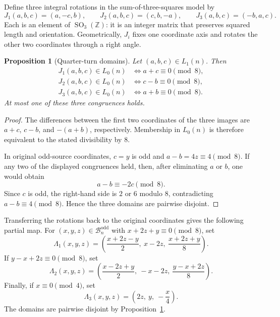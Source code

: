 \documentclass[11pt]{amsart}
\newtheorem{proposition}[theorem]{Proposition}
\theoremstyle{definition}
\theoremstyle{remark}
\newcommand{\Z}{\mathbb Z}
\newcommand{\Bodd}{\mathcal B_n^{\mathrm{odd}}}
\begin{document}
Define three integral rotations in the sum-of-three-squares model by
\[
 J_1(a,b,c)=(a,-c,b),
 \qquad
 J_2(a,b,c)=(c,b,-a),
 \qquad
 J_3(a,b,c)=(-b,a,c).
\]
Each is an element of $\operatorname{SO}_3(\Z)$: it is an integer matrix that
preserves squared length and orientation.  Geometrically, $J_i$ fixes one
coordinate axis and rotates the other two coordinates through a right angle.

\begin{proposition}[Quarter-turn domains]\label{prop:quarter-turn-domains}
Let $(a,b,c)\in L_1(n)$.  Then
\begin{align*}
 J_1(a,b,c)\in L_0(n)&\iff a+c\equiv0\pmod8,\\
 J_2(a,b,c)\in L_0(n)&\iff c-b\equiv0\pmod8,\\
 J_3(a,b,c)\in L_0(n)&\iff a+b\equiv0\pmod8.
\end{align*}
At most one of these three congruences holds.
\end{proposition}

\begin{proof}
The differences between the first two coordinates of the three images are
$a+c$, $c-b$, and $-(a+b)$, respectively.  Membership in $L_0(n)$ is
therefore equivalent to the stated divisibility by $8$.

In original odd-source coordinates, $c=y$ is odd and
$a-b=4z\equiv4\pmod8$.  If any two of the displayed congruences held, then,
after eliminating $a$ or $b$, one would obtain
\[
 a-b\equiv -2c\pmod8.
\]
Since $c$ is odd, the right-hand side is $2$ or $6$ modulo $8$, contradicting
$a-b\equiv4\pmod8$.  Hence the three domains are pairwise disjoint.
\end{proof}

Transferring the rotations back to the original coordinates gives the
following partial map.  For $(x,y,z)\in\Bodd$ with
$x+2z+y\equiv0\pmod8$, set
\begin{equation}\label{eq:Lambda1}
 \Lambda_1(x,y,z)=
 \left(\frac{x+2z-y}{2},\ x-2z,\ \frac{x+2z+y}{8}\right).
\end{equation}
If $y-x+2z\equiv0\pmod8$, set
\begin{equation}\label{eq:Lambda2}
 \Lambda_2(x,y,z)=
 \left(\frac{x-2z+y}{2},\ -x-2z,\ \frac{y-x+2z}{8}\right).
\end{equation}
Finally, if $x\equiv0\pmod4$, set
\begin{equation}\label{eq:Lambda3}
 \Lambda_3(x,y,z)=\left(2z,\ y,\ -\frac{x}{4}\right).
\end{equation}
The domains are pairwise disjoint by Proposition~\ref{prop:quarter-turn-domains}.
\end{document}

